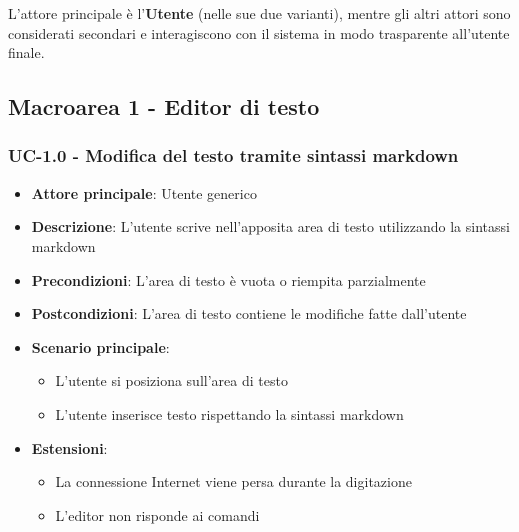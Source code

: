 \documentclass[11pt,a4paper]{article}
\begin{document}
L'attore principale è l'\textbf{Utente} (nelle sue due varianti), mentre gli altri attori sono considerati secondari e interagiscono con il sistema in modo trasparente all'utente finale.

\newpage

\subsection{Macroarea 1 - Editor di testo}
\subsubsection{UC-1.0 - Modifica del testo tramite sintassi markdown}
\begin{itemize}
    \item \textbf{Attore principale}: Utente generico
    \item \textbf{Descrizione}: L’utente scrive nell’apposita area di testo utilizzando la sintassi markdown
    \item \textbf{Precondizioni}: L’area di testo è vuota o riempita parzialmente
    \item \textbf{Postcondizioni}: L’area di testo contiene le modifiche fatte dall’utente
    \item \textbf{Scenario principale}:
        \begin{itemize}
            \item L’utente si posiziona sull’area di testo
            \item L’utente inserisce testo rispettando la sintassi markdown
        \end{itemize}
    \item \textbf{Estensioni}:
        \begin{itemize}
            \item La connessione Internet viene persa durante la digitazione
            \item L'editor non risponde ai comandi
        \end{itemize}
\end{itemize}
\end{document}
